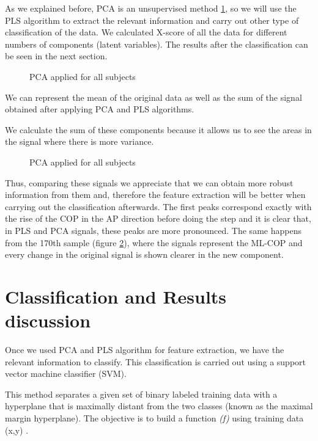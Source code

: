 As we explained before, PCA is an unsupervised method \ref{fig:PCA}, so we will use the PLS algorithm to extract the relevant information and carry out other type of classification of the data. We calculated X-score of all the data for different numbers of components (latent variables). The results after the classification can be seen in the next section.

\begin{figure}[H]
	\centering
	\caption{PCA applied for all subjects}
	\label{fig:PCA}
\end{figure}

We can represent the mean of the original data as well as the sum of the signal obtained after applying PCA and PLS algorithms.

We calculate the sum of these components because it allows us to see the areas in the signal where there is more variance.
\begin{figure}[H]
	\centering
	\caption{PCA applied for all subjects}
	\label{fig:OrigPCAPLS}
\end{figure}
Thus, comparing these signals we appreciate that we can obtain more robust information from them and, therefore the feature extraction will be better when carrying out the classification afterwards. The first peaks correspond exactly with the rise of the COP in the AP direction before doing the step and it is clear that, in PLS and PCA signals, these peaks are more pronounced. The same happens from the 170th sample (figure \ref{fig:OrigPCAPLS}), where the signals represent the ML-COP and every change in the original signal is shown clearer in the new component.



\section{Classification and Results discussion}

Once we used PCA and PLS algorithm for feature extraction, we have the relevant information to classify. This classification is carried out using a support vector machine classifier (SVM).

This method separates a given set of binary labeled training data with a hyperplane that is maximally distant from the two classes (known as the maximal margin hyperplane). The objective is to build a function \textit{(f)} using training data (x,y) \cite{Gorriz}.
 
